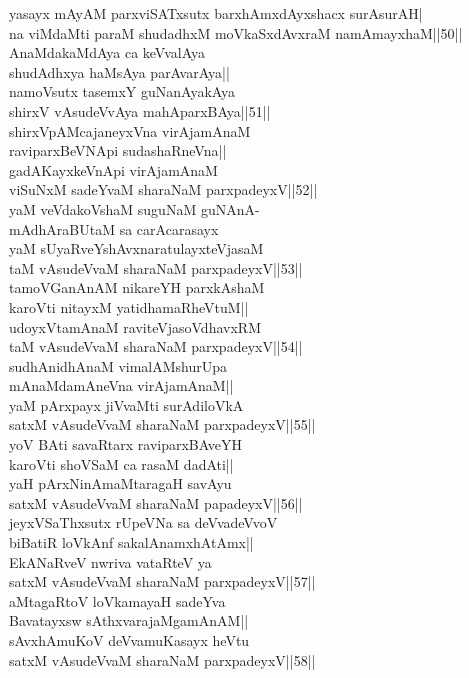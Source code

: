 \documentclass{article}
\begin{document}
yasayx mAyAM parxviSATxsutx barxhAmxdAyxshacx surAsurAH|\\
na viMdaMti paraM shudadhxM moVkaSxdAvxraM namAmayxhaM||50||\\
AnaMdakaMdAya ca keVvalAya\\
shudAdhxya haMsAya parAvarAya||\\
namoVsutx tasemxY guNanAyakAya\\
shirxV vAsudeVvAya mahAparxBAya||51||\\
shirxVpAMcajaneyxVna virAjamAnaM\\
raviparxBeVNApi sudashaRneVna||\\
gadAKayxkeVnApi virAjamAnaM\\
viSuNxM sadeYvaM sharaNaM parxpadeyxV||52||\\
yaM veVdakoVshaM suguNaM guNAnA-\\
mAdhAraBUtaM sa carAcarasayx\\
yaM sUyaRveYshAvxnaratulayxteVjasaM\\
taM vAsudeVvaM sharaNaM parxpadeyxV||53||\\
tamoVGanAnAM nikareYH parxkAshaM\\
karoVti nitayxM yatidhamaRheVtuM||\\
udoyxVtamAnaM raviteVjasoVdhavxRM\\
taM vAsudeVvaM sharaNaM parxpadeyxV||54||\\
sudhAnidhAnaM vimalAMshurUpa\\
mAnaMdamAneVna virAjamAnaM||\\
yaM pArxpayx jiVvaMti surAdiloVkA\\
satxM vAsudeVvaM sharaNaM parxpadeyxV||55||\\
yoV BAti savaRtarx raviparxBAveYH\\
karoVti shoVSaM ca rasaM dadAti||\\
yaH pArxNinAmaMtaragaH savAyu\\
satxM vAsudeVvaM sharaNaM papadeyxV||56||\\
jeyxVSaThxsutx rUpeVNa sa deVvadeVvoV\\
biBatiR loVkAnf sakalAnamxhAtAmx||\\
EkANaRveV nwriva vataRteV ya\\
satxM vAsudeVvaM sharaNaM parxpadeyxV||57||\\
aMtagaRtoV loVkamayaH sadeYva\\
Bavatayxsw sAthxvarajaMgamAnAM||\\
sAvxhAmuKoV deVvamuKasayx heVtu\\
satxM vAsudeVvaM sharaNaM parxpadeyxV||58||\\
\end{document}

